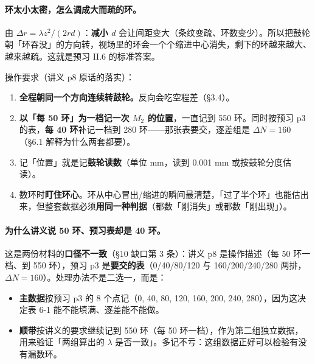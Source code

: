 \documentclass[11pt]{ctexart}
\begin{document}
\paragraph{环太小太密，怎么调成大而疏的环。}由 \(\Delta r=\lambda z^2/(2rd)\)：\textbf{减小 \(d\)} 会让间距变大（条纹变疏、环数变少）。所以把鼓轮朝「环吞没」的方向转，视场里的环会一个个缩进中心消失，剩下的环越来越大、越来越疏。这就是预习 II.6 的标准答案。



操作要求（讲义 p8 原话的落实）：

\begin{enumerate}
\item \textbf{全程朝同一个方向连续转鼓轮。}反向会吃空程差（§3.4）。
\item \textbf{以「每 50 环」为一档记一次 \(M_2\) 的位置}，一直记到 550 环。同时按预习 p3 的表，\textbf{每 40 环}补记一档到 280 环——那张表要交，逐差组是 \(\Delta N=160\)（§6.1 解释为什么两套都要）。
\item 记「位置」就是记\textbf{鼓轮读数}（单位 mm，读到 0.001 mm 或按鼓轮分度估读）。
\item 数环时\textbf{盯住环心}。环从中心冒出/缩进的瞬间最清楚，「过了半个环」也能估出来，但整套数据必须\textbf{用同一种判据}（都数「刚消失」或都数「刚出现」）。
\end{enumerate}

\paragraph{为什么讲义说 50 环、预习表却是 40 环。}这是两份材料的\textbf{口径不一致}（§10 缺口第 3 条）：讲义 p8 是操作描述（每 50 环一档、到 550 环），预习 p3 是\textbf{要交的表}（0/40/80/120 与 160/200/240/280 两排，\(\Delta N=160\)）。处理办法不是二选一，而是：

\begin{itemize}
\item \textbf{主数据}按预习 p3 的 8 个点记（0, 40, 80, 120, 160, 200, 240, 280），因为这决定表 6-1 能不能填满、逐差能不能做。
\item \textbf{顺带}按讲义的要求继续记到 550 环（每 50 环一档），作为第二组独立数据，用来验证「两组算出的 \(\lambda\) 是否一致」。多记不亏：这组数据正好可以检验有没有漏数环。
\end{itemize}
\end{document}

